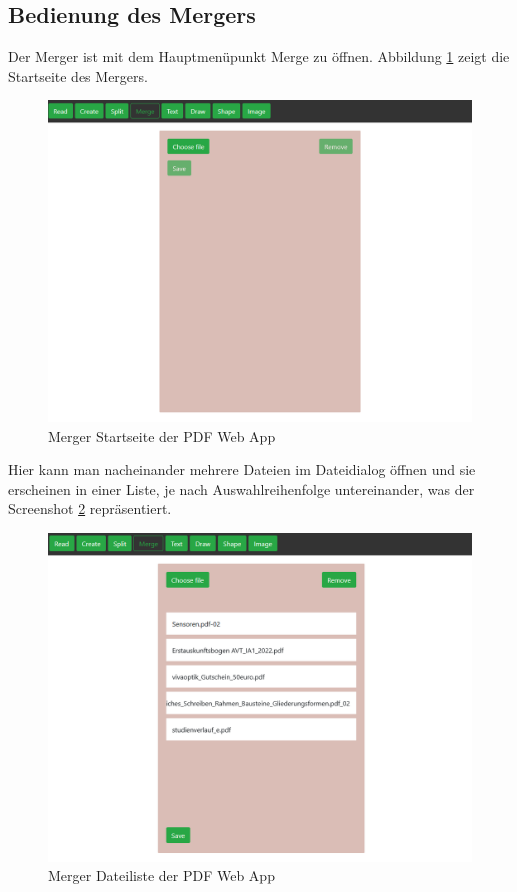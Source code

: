 \subsection{Bedienung des Mergers}
Der Merger ist mit dem Hauptmenüpunkt Merge zu öffnen. Abbildung \ref{fig:merger} zeigt die Startseite des Mergers. 
\begin{figure}[!htbp]
	\centering
	\includegraphics[width=1\textwidth]{"images/merger.png"}
	\caption{Merger Startseite der PDF Web App}
	\label{fig:merger}
\end{figure}
Hier kann man nacheinander mehrere Dateien im Dateidialog öffnen und sie erscheinen in einer Liste, je nach Auswahlreihenfolge untereinander, was der Screenshot \ref{fig:mergelist} repräsentiert. 
\begin{figure}[!htbp]
	\centering
	\includegraphics[width=1\textwidth]{"images/mergelist.png"}
	\caption{Merger Dateiliste der PDF Web App}
	\label{fig:mergelist}
\end{figure}
